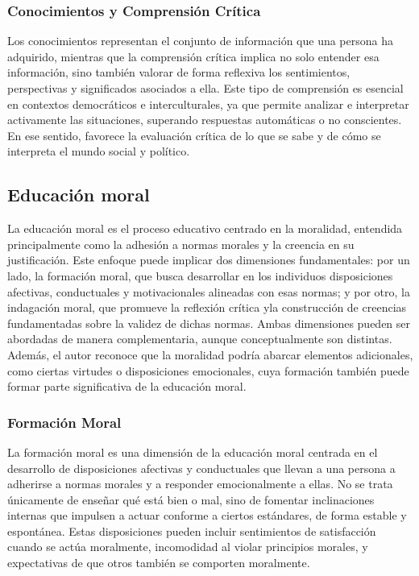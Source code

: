 \subsubsection{Conocimientos y Comprensión Crítica}
Los conocimientos representan el conjunto de información que una persona ha
adquirido, mientras que la comprensión crítica implica no solo entender esa
información, sino también valorar de forma reflexiva los sentimientos,
perspectivas y significados asociados a ella. Este tipo de comprensión es
esencial en contextos democráticos e interculturales, ya que permite analizar e
interpretar activamente las situaciones, superando respuestas automáticas o no
conscientes. En ese sentido, favorece la evaluación crítica de lo que se sabe y
de cómo se interpreta el mundo social y político. \cite{barrett2016competences}

\subsection{Educación moral}
La educación moral es el proceso educativo centrado en la moralidad, entendida
principalmente como la adhesión a normas morales y la creencia en su
justificación. Este enfoque puede implicar dos dimensiones fundamentales: por
un lado, la formación moral, que busca desarrollar en los individuos
disposiciones afectivas, conductuales y motivacionales alineadas con esas
normas; y por otro, la indagación moral, que promueve la reflexión crítica yla
construcción de creencias fundamentadas sobre la validez de dichas normas.
Ambas dimensiones pueden ser abordadas de manera complementaria, aunque
conceptualmente son distintas. Además, el autor reconoce que la moralidad
podría abarcar elementos adicionales, como ciertas virtudes o disposiciones
emocionales, cuya formación también puede formar parte significativa de la
educación moral. \cite{hand2017moral}

\subsubsection{Formación Moral}
La formación moral es una dimensión de la educación moral centrada en el
desarrollo de disposiciones afectivas y conductuales que llevan a una persona a
adherirse a normas morales y a responder emocionalmente a ellas. No se trata
únicamente de enseñar qué está bien o mal, sino de fomentar inclinaciones
internas que impulsen a actuar conforme a ciertos estándares, de forma estable
y espontánea. Estas disposiciones pueden incluir sentimientos de satisfacción
cuando se actúa moralmente, incomodidad al violar principios morales, y
expectativas de que otros también se comporten moralmente. \cite{hand2017moral}

